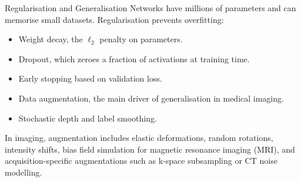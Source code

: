\begin{frame}{Regularisation and Generalisation}
    Networks have millions of parameters and can memorise small datasets. Regularisation prevents overfitting:
    \begin{itemize}
        \item Weight decay, the $\ell_2$ penalty on parameters.
        \item Dropout, which zeroes a fraction of activations at training time.
        \item Early stopping based on validation loss.
        \item Data augmentation, the main driver of generalisation in medical imaging.
        \item Stochastic depth and label smoothing.
    \end{itemize}
    In imaging, augmentation includes elastic deformations, random rotations, intensity shifts, bias field simulation for magnetic resonance imaging (MRI), and acquisition-specific augmentations such as k-space subsampling or CT noise modelling.
\end{frame}

